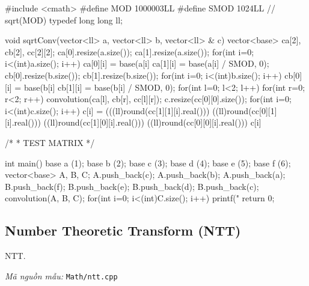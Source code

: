 \documentclass[11pt]{article}
\newcommand{\codepath}[1]{\par\noindent\textit{Mã nguồn mẫu:} \texttt{#1}\par}
\begin{document}
\begin{vncode}
#include <cmath>
#define MOD 1000003LL
#define SMOD 1024LL // ~ sqrt(MOD)
typedef long long ll;

void sqrtConv(vector<ll> a, vector<ll> b, vector<ll> & c) {
	vector<base> ca[2], cb[2], cc[2][2];
	ca[0].resize(a.size());
	ca[1].resize(a.size());
	for(int i=0; i<(int)a.size(); i++) {
		ca[0][i] = base(a[i] %
		ca[1][i] = base(a[i] / SMOD, 0);
	}
	cb[0].resize(b.size());
	cb[1].resize(b.size());
	for(int i=0; i<(int)b.size(); i++) {
		cb[0][i] = base(b[i] %
		cb[1][i] = base(b[i] / SMOD, 0);
	}
	for(int l=0; l<2; l++) for(int r=0; r<2; r++)
		convolution(ca[l], cb[r], cc[l][r]);
	c.resize(cc[0][0].size());
	for(int i=0; i<(int)c.size(); i++) {
		c[i] =
		(((ll)round(cc[1][1][i].real()))%
		((ll)round(cc[0][1][i].real()))%
		((ll)round(cc[1][0][i].real()))%
		((ll)round(cc[0][0][i].real()))%
		c[i] %
	}
}

/*
 * TEST MATRIX
 */

int main()
{
	base a (1);
	base b (2);
	base c (3);
	base d (4);
	base e (5);
	base f (6);
	vector<base> A, B, C;
	A.push_back(c);
	A.push_back(b);
	A.push_back(a);
	B.push_back(f);
	B.push_back(e);
	B.push_back(d);
	B.push_back(c);
	convolution(A, B, C);
	for(int i=0; i<(int)C.size(); i++) {
		printf(" %
	}
	return 0;
}
\end{vncode}
\endgroup


\subsection{Number Theoretic Transform (NTT)}

NTT.

\codepath{Math/ntt.cpp}
\end{document}
